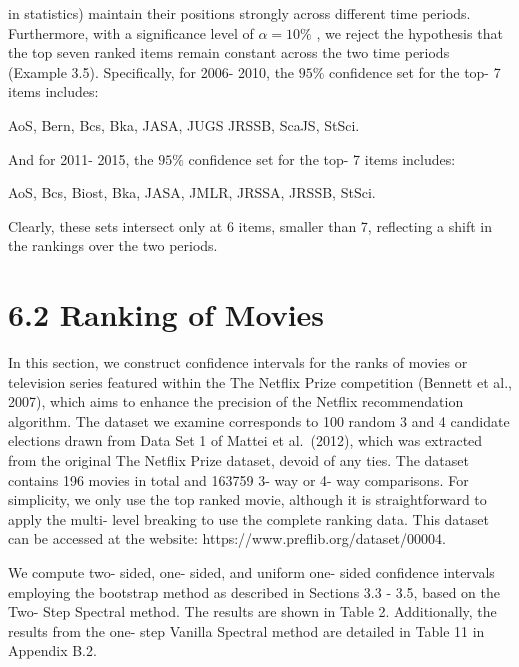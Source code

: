 in statistics) maintain their positions strongly across different time
periods. Furthermore, with a significance level of \(\alpha = 10\%\) ,
we reject the hypothesis that the top seven ranked items remain constant
across the two time periods (Example 3.5). Specifically, for 2006- 2010,
the \(95\%\) confidence set for the top- 7 items includes:

AoS, Bern, Bcs, Bka, JASA, JUGS JRSSB, ScaJS, StSci.

And for 2011- 2015, the \(95\%\) confidence set for the top- 7 items
includes:

AoS, Bcs, Biost, Bka, JASA, JMLR, JRSSA, JRSSB, StSci.

Clearly, these sets intersect only at 6 items, smaller than 7,
reflecting a shift in the rankings over the two periods.

\section{6.2 Ranking of Movies}\label{ranking-of-movies}

In this section, we construct confidence intervals for the ranks of
movies or television series featured within the The Netflix Prize
competition (Bennett et al., 2007), which aims to enhance the precision
of the Netflix recommendation algorithm. The dataset we examine
corresponds to 100 random 3 and 4 candidate elections drawn from Data
Set 1 of Mattei et al.~(2012), which was extracted from the original The
Netflix Prize dataset, devoid of any ties. The dataset contains 196
movies in total and 163759 3- way or 4- way comparisons. For simplicity,
we only use the top ranked movie, although it is straightforward to
apply the multi- level breaking to use the complete ranking data. This
dataset can be accessed at the website:
https://www.preflib.org/dataset/00004.

We compute two- sided, one- sided, and uniform one- sided confidence
intervals employing the bootstrap method as described in Sections 3.3 -
3.5, based on the Two- Step Spectral method. The results are shown in
Table 2. Additionally, the results from the one- step Vanilla Spectral
method are detailed in Table 11 in Appendix B.2.


